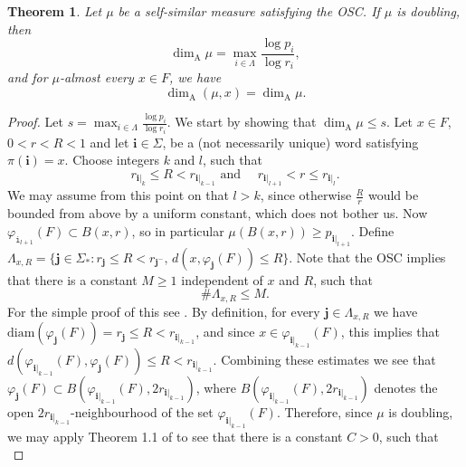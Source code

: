 \documentclass{PRM}
\newcommand{\diam}{\mathrm{diam}}
\newcommand{\adim}{\dim_{\mathrm{A}}}
\newcommand{\iii}{\mathbf{i}}
\theoremstyle{plain}
\newtheorem{thm}{Theorem}[section]
\theoremstyle{definition}
\theoremstyle{remark}
\begin{document}
\begin{thm}\label{thm:osc_formula}
Let $\mu$ be a self-similar measure satisfying the OSC. If $\mu$ is doubling, then
\begin{equation*}
    \dim_{\mathrm{A}}\mu=\max_{i\in\Lambda}\frac{\log p_i}{\log r_i},
\end{equation*}
and for $\mu$-almost every $x\in F$, we have
\begin{equation*}
    \dim_{\mathrm{A}}(\mu,x)=\adim\mu.
\end{equation*}

\end{thm}
\begin{proof}
Let $s=\max_{i\in\Lambda}\frac{\log p_i}{\log r_i}$. We start by showing that $\adim\mu\leq s$. Let $x\in F$, $0<r<R<1$ and let $\iii\in\Sigma$, be a (not necessarily unique) word satisfying $\pi(\iii)=x$. Choose integers $k$ and $l$, such that
\begin{equation*}
    r_{\mathbf{i}|_k}\leq R < r_{\mathbf{i}|_{k-1}}\text{ and }\quad r_{\mathbf{i}|_{l+1}}< r \leq r_{\mathbf{i}|_{l}}.
\end{equation*}
We may assume from this point on that $l>k$, since otherwise $\frac{R}{r}$ would be bounded from above by a uniform constant, which does not bother us. Now $\varphi_{\mathtt{i}_{l+1}}(F)\subset B(x,r)$, so in particular $\mu(B(x,r))\geq p_{\mathbf{i}|_{l+1}}$. Define $\Lambda_{x,R}=\{\mathbf{j}\in\Sigma_*\colon r_{\mathbf{j}}\leq R < r_{\mathbf{j}^{-}}, \,d(x,\varphi_{\mathbf{j}}(F))\leq R\}$. Note that the OSC implies that there is a constant $M\geq 1$ independent of $x$ and $R$, such that
\begin{equation*}
    \#\Lambda_{x,R}\leq M.
\end{equation*}
For the simple proof of this see \cite[Proposition 1.5.8]{Kig}. By definition, for every $\mathbf{j}\in\Lambda_{x,R}$ we have $\diam(\varphi_{\mathbf{j}}(F))=r_{\mathbf{j}}\leq R < r_{\mathbf{i}|_{k-1}}$,
and since $x\in \varphi_{\mathbf{i}|_{k-1}}(F)$, this implies that $d(\varphi_{\mathbf{i}|_{k-1}}(F),\varphi_{\mathbf{j}}(F))\leq R < r_{\mathbf{i}|_{k-1}}$.
Combining these estimates we see that $\varphi_{\mathbf{j}}(F)\subset B(\varphi_{\mathbf{i}|_{k-1}}(F),2r_{\mathbf{i}|_{k-1}})$, where $B(\varphi_{\mathbf{i}|_{k-1}}(F),2r_{\mathbf{i}|_{k-1}})$ denotes the open $2r_{\mathbf{i}|_{k-1}}$-neighbourhood of the set $\varphi_{\mathbf{i}|_{k-1}}(F)$. Therefore, since $\mu$ is doubling, we may apply Theorem 1.1 of \cite{Yung} to see that there is a constant $C>0$, such that
\begin{equation*}

\end{equation*}
\end{proof}
\end{document}
